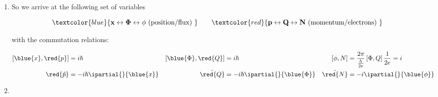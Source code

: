 \begin{enumerate}
 	\item So we arrive at the following set of variables
 	
 	\begin{equation}
 	{ \textcolor{blue}{\mathbf{x\leftrightarrow \Phi \leftrightarrow \phi} \text{ (position/flux) }}\qquad \textcolor{red}{\mathbf{p\leftrightarrow Q \leftrightarrow N \text{ (momentum/electrons) }}}}
 	\end{equation}
 	
 	\noindent with the commutation relations:
 	
 	\begin{align}
 	\left[\blue{x},\red{p}\right] & =i\hbar & \left[\blue{\Phi},\red{Q}\right] & = i\hbar & \left[\phi,N\right] & = \frac{2\pi}{\frac{h}{2e}}\left[\Phi,Q\right]\frac{1}{2e} = i\\
 	\red{\hat{p}} & = -i\hbar\ipartial{}{\blue{x}} & \hat{\red{Q}} & =-i\hbar\ipartial{}{\blue{\Phi}} & \hat{\red{N}} & =-i\ipartial{}{\blue{\phi}}
 	\end{align}
 	
 	\item\ 
 	
 \end{enumerate}

